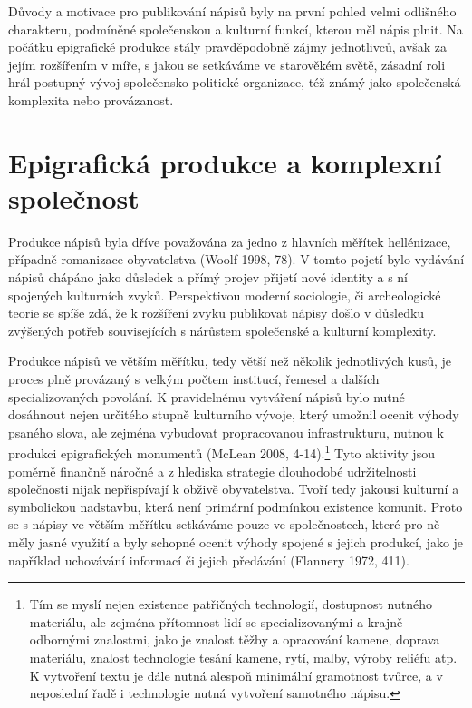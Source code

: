 Důvody a motivace pro publikování nápisů byly na první pohled velmi odlišného charakteru, podmíněné společenskou a kulturní funkcí, kterou měl nápis plnit. Na počátku epigrafické produkce stály pravděpodobně zájmy jednotlivců, avšak za jejím rozšířením v míře, s jakou se setkáváme ve starověkém světě, zásadní roli hrál postupný vývoj společensko-politické organizace, též známý jako společenská komplexita nebo provázanost.

\section[epigrafická-produkce-a-komplexní-společnost]{Epigrafická produkce a komplexní společnost}

Produkce nápisů byla dříve považována za jedno z hlavních měřítek hellénizace, případně romanizace obyvatelstva (Woolf 1998, 78). V tomto pojetí bylo vydávání nápisů chápáno jako důsledek a přímý projev přijetí nové identity a s ní spojených kulturních zvyků. Perspektivou moderní sociologie, či archeologické teorie se spíše zdá, že k rozšíření zvyku publikovat nápisy došlo v důsledku zvýšených potřeb souvisejících s nárůstem společenské a kulturní komplexity.

Produkce nápisů ve větším měřítku, tedy větší než několik jednotlivých kusů, je proces plně provázaný s velkým počtem institucí, řemesel a dalších specializovaných povolání. K pravidelnému vytváření nápisů bylo nutné dosáhnout nejen určitého stupně kulturního vývoje, který umožnil ocenit výhody psaného slova, ale zejména vybudovat propracovanou infrastrukturu, nutnou k produkci epigrafických monumentů (McLean 2008, 4-14).\footnote{Tím se myslí nejen existence patřičných technologií, dostupnost nutného materiálu, ale zejména přítomnost lidí se specializovanými a krajně odbornými znalostmi, jako je znalost těžby a opracování kamene, doprava materiálu, znalost technologie tesání kamene, rytí, malby, výroby reliéfu atp. K vytvoření textu je dále nutná alespoň minimální gramotnost tvůrce, a v neposlední řadě i technologie nutná vytvoření samotného nápisu.} Tyto aktivity jsou poměrně finančně náročné a z hlediska strategie dlouhodobé udržitelnosti společnosti nijak nepřispívají k obživě obyvatelstva. Tvoří tedy jakousi kulturní a symbolickou nadstavbu, která není primární podmínkou existence komunit. Proto se s nápisy ve větším měřítku setkáváme pouze ve společnostech, které pro ně měly jasné využití a byly schopné ocenit výhody spojené s jejich produkcí, jako je například uchovávání informací či jejich předávání (Flannery 1972, 411).

